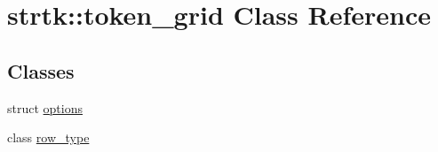 \hypertarget{classstrtk_1_1token__grid}{\section{strtk\-:\-:token\-\_\-grid Class Reference}
\label{classstrtk_1_1token__grid}
}
\subsection*{Classes}
\begin{DoxyCompactItemize}
\item 
struct \hyperlink{structstrtk_1_1token__grid_1_1options}{options}
\item 
class \hyperlink{classstrtk_1_1token__grid_1_1row__type}{row\-\_\-type}
\end{DoxyCompactItemize}
